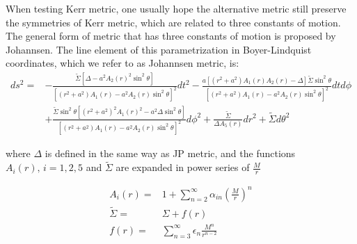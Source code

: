 \documentclass{article}
\begin{document}
When testing Kerr metric, one usually hope the alternative metric still preserve the symmetries of Kerr metric, which are related to three constants of motion. The general form of metric that has three constants of motion is proposed by Johannsen\cite{johannsen_final}. The line element of this parametrization in Boyer-Lindquist coordinates, which we refer to as Johannsen metric, is:
\begin{equation}
\begin{aligned}
	ds^2 =& -\frac{\tilde{\Sigma} [\Delta - a^2 A_2(r)^2 \sin^2\theta ] }{ [ (r^2+a^2)A_1(r) - a^2 A_2(r) \sin^2\theta ]^2 } dt^2 -  \frac{a [(r^2 + a^2 )A_1(r)A_2(r) - \Delta ] \tilde{\Sigma} \sin^2\theta }{ [(r^2+a^2 ) A_1(r) -a^2 A_2(r) \sin^2 \theta ]^2 } dtd\phi\\
	& + \frac{\tilde{\Sigma} \sin^2\theta [(r^2+a^2)^2 A_1(r)^2 - a^2\Delta \sin^2\theta  ]}{ [(r^2+a^2)A_1(r) - a^2 A_2(r) \sin^2 \theta ]^2 } d\phi^2 +\frac{\tilde{\Sigma}}{\Delta A_5(r)} dr^2  + \tilde{\Sigma} d\theta^2
\end{aligned}
\end{equation}

where $\Delta$ is defined in the same way as JP metric, and the functions $A_i(r),\,i=1,2,5$ and $\tilde{\Sigma}$ are expanded in power series of $\frac{M}{r}$

\begin{equation}
\begin{aligned}
	A_i(r) =& 1+ \sum_{n=2}^{\infty} \alpha_{in} (\frac M r)^n\\
	\tilde{\Sigma} =& \Sigma +f(r)\\
	f(r)=&\sum_{n=3}^{\infty} \epsilon_n \frac{M^n}{r^{n-2}}
\end{aligned}
\end{equation}
\end{document}
